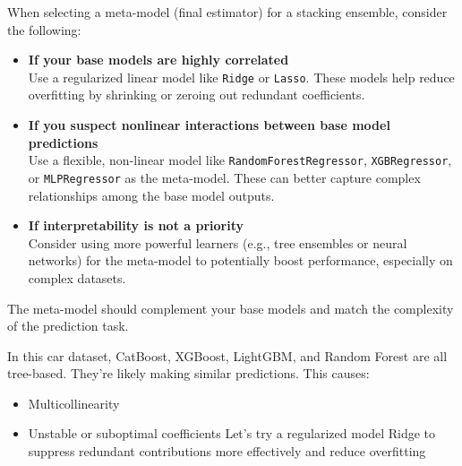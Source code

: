 \documentclass[
  letterpaper,
  DIV=11,
  numbers=noendperiod]{scrreprt}
\begin{document}
When selecting a meta-model (final estimator) for a stacking ensemble,
consider the following:

\begin{itemize}
\item
  \textbf{If your base models are highly correlated}\\
  Use a regularized linear model like \texttt{Ridge} or \texttt{Lasso}.
  These models help reduce overfitting by shrinking or zeroing out
  redundant coefficients.
\item
  \textbf{If you suspect nonlinear interactions between base model
  predictions}\\
  Use a flexible, non-linear model like \texttt{RandomForestRegressor},
  \texttt{XGBRegressor}, or \texttt{MLPRegressor} as the meta-model.
  These can better capture complex relationships among the base model
  outputs.
\item
  \textbf{If interpretability is not a priority}\\
  Consider using more powerful learners (e.g., tree ensembles or neural
  networks) for the meta-model to potentially boost performance,
  especially on complex datasets.
\end{itemize}

The meta-model should complement your base models and match the
complexity of the prediction task.

In this car dataset, CatBoost, XGBoost, LightGBM, and Random Forest are
all tree-based. They're likely making similar predictions. This causes:

\begin{itemize}
\item
  Multicollinearity
\item
  Unstable or suboptimal coefficients Let's try a regularized model
  Ridge to suppress redundant contributions more effectively and reduce
  overfitting
\end{itemize}
\end{document}
